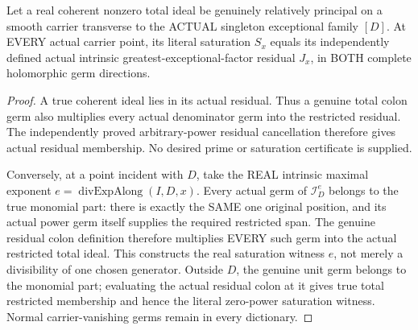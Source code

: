 \begin{theorem}
\label{hir:sharp-actual-single-exceptional-saturation-eq-residual}
\leanok
Let a real coherent nonzero total ideal be genuinely relatively principal
on a smooth carrier transverse to the ACTUAL singleton exceptional family
$[D]$. At EVERY actual carrier point, its literal saturation $S_x$ equals
its independently defined actual intrinsic greatest-exceptional-factor
residual $J_x$, in BOTH complete holomorphic germ directions.
\end{theorem}
\begin{proof}
A true coherent ideal lies in its actual residual. Thus a genuine total
colon germ also multiplies every actual denominator germ into the restricted
residual. The independently proved arbitrary-power residual cancellation
therefore gives actual residual membership. No desired prime or saturation
certificate is supplied.

Conversely, at a point incident with $D$, take the REAL intrinsic maximal
exponent $e=\operatorname{divExpAlong}(I,D,x)$. Every actual germ of
$\mathcal I_D^e$ belongs to the true monomial part: there is exactly the
SAME one original position, and its actual power germ itself supplies the
required restricted span. The genuine residual colon definition therefore
multiplies EVERY such germ into the actual restricted total ideal. This
constructs the real saturation witness $e$, not merely a divisibility of
one chosen generator. Outside $D$, the genuine unit germ belongs to the
monomial part; evaluating the actual residual colon at it gives true total
restricted membership and hence the literal zero-power saturation witness.
Normal carrier-vanishing germs remain in every dictionary.
\end{proof}

